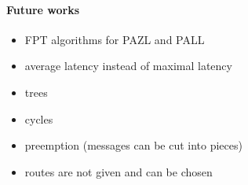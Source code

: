 \documentclass[a4paper,10pt]{article}
\begin{document}
    \paragraph*{Future works}
   
   \begin{itemize}
    \item FPT algorithms for PAZL and PALL 
    \item average latency instead of maximal latency
    \item trees
    \item cycles 
    \item preemption (messages can be cut into pieces)
    \item routes are not given and can be chosen
   \end{itemize}

   




\end{document}
